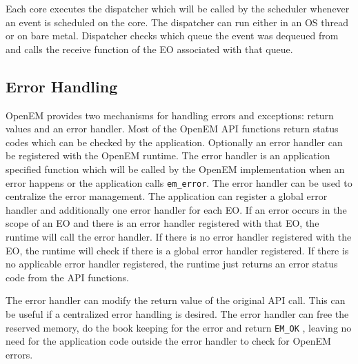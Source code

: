 Each core executes the dispatcher which will be called by the scheduler whenever an event is scheduled on the core. The dispatcher can run either in an OS thread or on bare metal. Dispatcher checks which queue the event was dequeued from and calls the receive function of the EO associated with that queue. \cite{openemintro}

\subsection{Error Handling}
\label{subsec:error}
OpenEM provides two mechanisms for handling errors and exceptions: return values and an error handler. Most of the OpenEM API functions return status codes which can be checked by the application. \cite{openempage} Optionally an error handler can be registered with the OpenEM runtime. The error handler is an application specified function which will be called by the OpenEM implementation when an error happens or the application calls \texttt{em\_error}. The error handler can be used to centralize the error management. The application can register a global error handler and additionally one error handler for each EO. If an error occurs in the scope of an EO and there is an error handler registered with that EO, the runtime will call the error handler. If there is no error handler registered with the EO, the runtime will check if there is a global error handler registered. If there is no applicable error handler registered, the runtime just returns an error status code from the API functions. \cite{openempage}

The error handler can modify the return value of the original API call. This can be useful if a centralized error handling is desired. The error handler can free the reserved memory, do the book keeping for the error and return \texttt{EM\_OK} , leaving no need for the application code outside the error handler to check for OpenEM errors. \cite{openempage}

